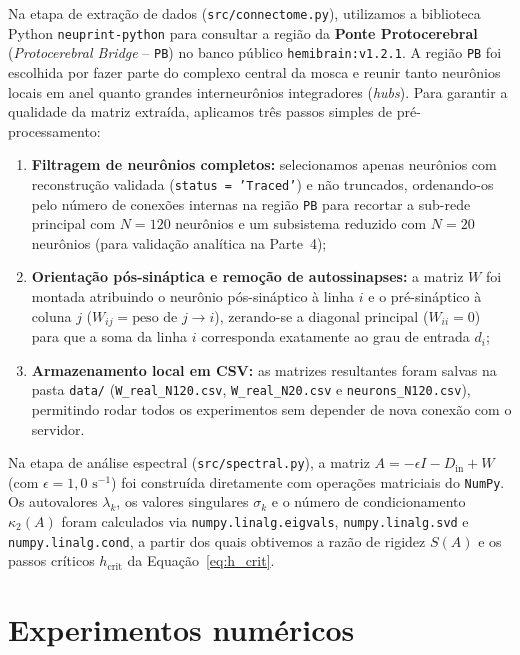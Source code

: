 \documentclass[12pt,a4paper]{article}
\begin{document}
Na etapa de extração de dados (\texttt{src/connectome.py}), utilizamos a biblioteca Python \texttt{neuprint-python} para consultar a região da \textbf{Ponte Protocerebral} (\textit{Protocerebral Bridge} -- \texttt{PB}) no banco público \texttt{hemibrain:v1.2.1}. A região \texttt{PB} foi escolhida por fazer parte do complexo central da mosca e reunir tanto neurônios locais em anel quanto grandes interneurônios integradores (\textit{hubs}). Para garantir a qualidade da matriz extraída, aplicamos três passos simples de pré-processamento:
\begin{enumerate}
    \item \textbf{Filtragem de neurônios completos:} selecionamos apenas neurônios com reconstrução validada (\texttt{status = 'Traced'}) e não truncados, ordenando-os pelo número de conexões internas na região \texttt{PB} para recortar a sub-rede principal com $N = 120$ neurônios e um subsistema reduzido com $N = 20$ neurônios (para validação analítica na Parte~4);
    \item \textbf{Orientação pós-sináptica e remoção de autossinapses:} a matriz $W$ foi montada atribuindo o neurônio pós-sináptico à linha $i$ e o pré-sináptico à coluna $j$ ($W_{ij} = \text{peso de } j \to i$), zerando-se a diagonal principal ($W_{ii} = 0$) para que a soma da linha $i$ corresponda exatamente ao grau de entrada $d_i$;
    \item \textbf{Armazenamento local em CSV:} as matrizes resultantes foram salvas na pasta \texttt{data/} (\texttt{W\_real\_N120.csv}, \texttt{W\_real\_N20.csv} e \texttt{neurons\_N120.csv}), permitindo rodar todos os experimentos sem depender de nova conexão com o servidor.
\end{enumerate}

Na etapa de análise espectral (\texttt{src/spectral.py}), a matriz $A = -\epsilon I - D_{\text{in}} + W$ (com $\epsilon = 1{,}0\text{ s}^{-1}$) foi construída diretamente com operações matriciais do \texttt{NumPy}. Os autovalores $\lambda_k$, os valores singulares $\sigma_k$ e o número de condicionamento $\kappa_2(A)$ foram calculados via \texttt{numpy.linalg.eigvals}, \texttt{numpy.linalg.svd} e \texttt{numpy.linalg.cond}, a partir dos quais obtivemos a razão de rigidez $S(A)$ e os passos críticos $h_{\text{crit}}$ da Equação~\eqref{eq:h_crit}.

\section{Experimentos numéricos}
\end{document}

